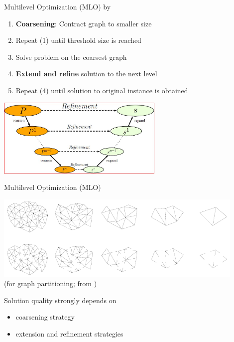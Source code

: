 \documentclass[aspectratio=1610]{beamer}
\newcommand{\important}[1]{{\color{green!60!black}#1}}
\begin{document}
\begin{frame}{Multilevel Optimization (MLO) by \citet{walshaw-04}}

	\begin{enumerate}
		\item \important{\bf Coarsening}: Contract graph to smaller size
		\item Repeat (1) until threshold size is reached
		\item Solve problem on the coarsest graph
		\item \important{\bf Extend and refine} solution to the next level
		\item Repeat (4) until solution to original instance is obtained
	\end{enumerate}

	\bigskip
	\begin{center}
		\includegraphics[width=0.6\textwidth]{graphics/multilevel.jpg}\\
	\end{center}
\end{frame}

\begin{frame}{Multilevel Optimization (MLO)}
	\citep{walshaw-04}

	\bigskip
	\begin{center}
		\includegraphics[width=0.9\textwidth]{graphics/mlr-gpp.png}\\
		{\small (for graph partitioning; from \citet{walshaw-04})}
	\end{center}

\important{Solution quality strongly depends on}
\begin{itemize}
	\item coarsening strategy
	\item extension and refinement strategies
\end{itemize}
\end{frame}
\end{document}
